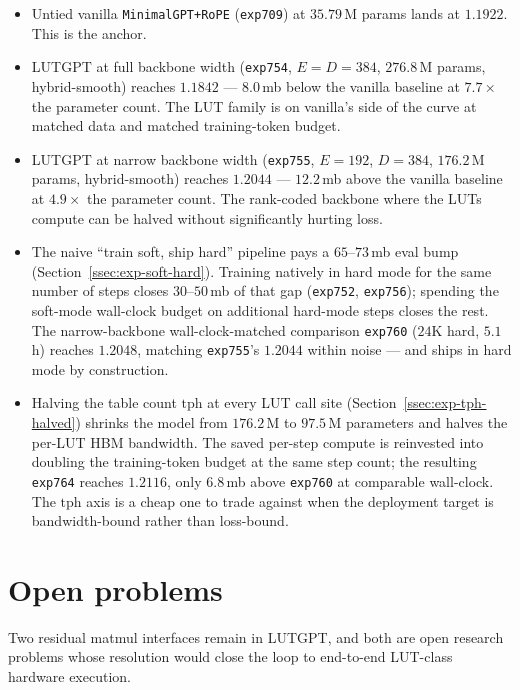 \documentclass[11pt]{article}
\begin{document}
\begin{itemize}[leftmargin=*,topsep=2pt,itemsep=1pt]
\item Untied vanilla \texttt{MinimalGPT+RoPE} (\texttt{exp709}) at $35.79$\,M params lands at $1.1922$. This is the anchor.
\item LUTGPT at full backbone width (\texttt{exp754}, $E = D = 384$, $276.8$\,M params, hybrid-smooth) reaches $1.1842$ --- $8.0$\,mb below the vanilla baseline at $7.7\times$ the parameter count. The LUT family is on vanilla's side of the curve at matched data and matched training-token budget.
\item LUTGPT at narrow backbone width (\texttt{exp755}, $E = 192$, $D = 384$, $176.2$\,M params, hybrid-smooth) reaches $1.2044$ --- $12.2$\,mb above the vanilla baseline at $4.9\times$ the parameter count. The rank-coded backbone where the LUTs compute can be halved without significantly hurting loss.
\item The naive ``train soft, ship hard'' pipeline pays a $65$--$73$\,mb eval bump (Section~\ref{ssec:exp-soft-hard}). Training natively in hard mode for the same number of steps closes $30$--$50$\,mb of that gap (\texttt{exp752}, \texttt{exp756}); spending the soft-mode wall-clock budget on additional hard-mode steps closes the rest. The narrow-backbone wall-clock-matched comparison \texttt{exp760} ($24$K hard, $5.1$ h) reaches $1.2048$, matching \texttt{exp755}'s $1.2044$ within noise --- and ships in hard mode by construction.
\item Halving the table count $\mathrm{tph}$ at every LUT call site (Section~\ref{ssec:exp-tph-halved}) shrinks the model from $176.2$\,M to $97.5$\,M parameters and halves the per-LUT HBM bandwidth. The saved per-step compute is reinvested into doubling the training-token budget at the same step count; the resulting \texttt{exp764} reaches $1.2116$, only $6.8$\,mb above \texttt{exp760} at comparable wall-clock. The $\mathrm{tph}$ axis is a cheap one to trade against when the deployment target is bandwidth-bound rather than loss-bound.
\end{itemize}

\FloatBarrier

\section{Open problems}
\label{sec:open}

Two residual matmul interfaces remain in LUTGPT, and both are open research problems whose resolution would close the loop to end-to-end LUT-class hardware execution.
\end{document}
